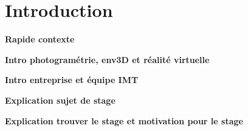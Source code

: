 \chapter{Introduction}

\par
\textbf{Rapide contexte}

\par
\textbf{Intro photogramétrie, env3D et réalité virtuelle}

\par
\textbf{Intro entreprise et équipe IMT}

\par
\textbf{Explication sujet de stage}

\par
\textbf{Explication trouver le stage et motivation pour le stage}

